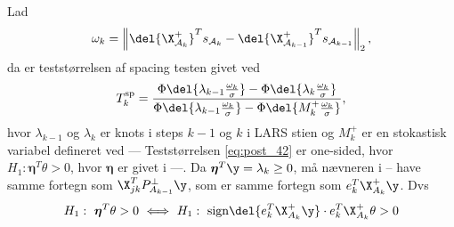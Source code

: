 Lad
\begin{align}
\omega_k = \left\Vert \del{\X_{\mathcal{A}_k}^+}^T s_{\mathcal{A}_k} -   \del{\X_{\mathcal{A}_{k-1}}^+}^T s_{\mathcal{A}_{k-1}} \right\Vert_2, \label{eq:post_41}
\end{align}
da er teststørrelsen af spacing testen givet ved
\begin{align}
T_k^\text{sp}= \frac{\Phi \del{\lambda_{k-1} \frac{\omega_k}{\sigma}} - \Phi \del{\lambda_{k} \frac{\omega_k}{\sigma}}}{\Phi \del{\lambda_{k-1} \frac{\omega_k}{\sigma}} - \Phi \del{M_{k}^+ \frac{\omega_k}{\sigma}}}, \label{eq:post_42}
\end{align}
hvor \(\lambda_{k-1}\) og \(\lambda_k\) er knots i steps \(k-1\) og \(k\) i LARS stien og \(M_k^+\) er en stokastisk variabel defineret ved
---
Teststørrelsen \eqref{eq:post_42} er one-sided, hvor \(H_1:\boldsymbol{\eta}^T \theta > 0 \), hvor \(\boldsymbol{\eta}\) er givet i ---.
Da \(\boldsymbol{\eta}^T \y = \lambda_k \geq 0\), må nævneren i -- have samme fortegn som \(\X_{jk}^T P_{A_{k-1}}^\perp \y \), som er samme fortegn som \(e_k^T \X_{A_k}^+ \y\). Dvs
\begin{align*}
H_1: \ \boldsymbol{\eta}^T \theta > 0 \ \Longleftrightarrow \ H_1: \ \text{sign} \del{e_k^T \X_{A_k}^+ \y} \cdot e_k^T \X_{A_k}^+ \theta > 0
\end{align*}


